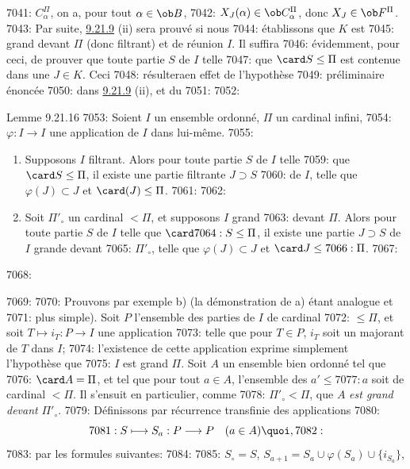 7041: $C^{\Pi}_{\alpha}$, on a, pour tout $\alpha\in \ob B$,
7042: $X_J(\alpha)\in \ob C^{\Pi}_{\alpha}$, donc $X_J\in \ob F^{\Pi}$.
7043: Par suite, \hyperref[I.lem9.21.9]{9.21.9} (ii) sera prouvé si nous
7044: établissons que $K$ est
7045: grand devant $\Pi$ (donc filtrant) et de réunion $I$. Il suffira
7046: évidemment, pour ceci, de prouver que toute partie $S$ de $I$ telle
7047: que $\card S\leq \Pi$ est contenue dans une $J\in K$. Ceci
7048: résultera\pageoriginale en effet de l'hypothèse
7049: préliminaire énoncée
7050: dans \hyperref[I.lem9.21.9]{9.21.9} (ii), et du
7051: 
7052: \begin{enonce*}{Lemme 9.21.16}
7053: Soient $I$ un ensemble ordonné, $\Pi$ un cardinal infini,
7054: $\varphi:I\rightarrow I$ une application de $I$ dans lui-même.
7055: \begin{enumerate}
7056: \renewcommand{\theenumi}{\alph{enumi}}
7057: \renewcommand{\labelenumi}{\theenumi)}
7058: \item Supposons $I$ filtrant. Alors pour toute partie $S$ de $I$ telle
7059: que $\card S\leq \Pi$, il existe une partie filtrante $J\supset S$
7060: de $I$, telle que $\varphi(J)\subset J$ et $\card(J)\leq \Pi$.
7061: 
7062: \item Soit $\Pi'_{\circ}$ un cardinal $<\Pi$, et supposons $I$ grand
7063: devant $\Pi$. Alors pour toute partie $S$ de $I$ telle que $\card
7064: S\leq \Pi$, il existe une partie $J\supset S$ de $I$ grande devant
7065: $\Pi'_{\circ}$, telle que $\varphi(J)\subset J$ et $\card J\leq
7066: \Pi$.
7067: \end{enumerate}
7068: \end{enonce*}
7069: 
7070: Prouvons par exemple b) (la démonstration de a) étant analogue et
7071: plus simple). Soit $P$ l'ensemble des parties de $I$ de cardinal
7072: $\leq \Pi$, et soit $T\mapsto i_T:P\rightarrow I$ une application
7073: telle que pour $T\in P$, $i_T$ soit un majorant de $T$ dans $I$;
7074: l'existence de cette application exprime simplement l'hypothèse que
7075: $I$ est grand $\Pi$. Soit $A$ un ensemble bien ordonné tel que
7076: $\card A=\Pi$, et tel que pour tout $a\in A$, l'ensemble des $a'\leq
7077: a$ soit de cardinal $<\Pi$. Il s'ensuit en particulier, comme
7078: $\Pi'_{\circ}<\Pi$, que $A$ \emph{est grand devant} $\Pi'_{\circ}$.
7079: Définissons par récurrence transfinie des applications
7080: $$
7081: S\longmapsto S_a: P\longrightarrow P\quad(a\in A){\quoi},
7082: $$
7083: par les formules suivantes:
7084: 
7085: $S_{\circ}=S$, $S_{a+1}=S_a\cup \varphi(S_a)\cup\{i_{S_a}\}$,
